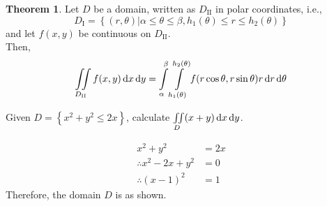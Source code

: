 \documentclass[fleqn, a4paper, 12pt, twoside]{article}
\theoremstyle{definition}
\theoremstyle{theorem}
\newtheorem{theorem}{Theorem}
\begin{document}
{\begin{theorem}
	Let $D$ be a domain, written as $D_{\mathrm{II}}$ in polar coordinates, i.e.,
	\begin{equation*}
		D_{\mathrm{I}} = \left\{ (r,\theta) | \alpha \le \theta \le \beta , h_1(\theta) \le r \le h_2(\theta) \right\}
	\end{equation*}
	and let $f(x,y)$ be continuous on $D_{\mathrm{II}}$.\\
	Then,
	\begin{equation*}
		\iint\limits_{D_{\mathrm{II}}} f(x,y) \dif x \dif y = \int\limits_{\alpha}^{\beta} \int\limits_{h_1(\theta)}^{h_2(\theta)} f(r \cos \theta, r \sin \theta) r \dif r\dif \theta
	\end{equation*}
\end{theorem}

\begin{question}
	Given $D = \left\{ x^2 + y^2 \le 2 x \right\}$, calculate $\iint\limits_{D} (x + y) \dif x \dif y$.
\end{question}

\begin{solution}
	\begin{align*}
		x^2 + y^2                  & = 2 x \\
		\therefore x^2 - 2 x + y^2 & = 0   \\
		\therefore (x - 1)^2       & = 1
	\end{align*}
	Therefore, the domain $D$ is as shown.
	\begin{figure}[H]
\end{figure}
\end{solution}}
\end{document}
